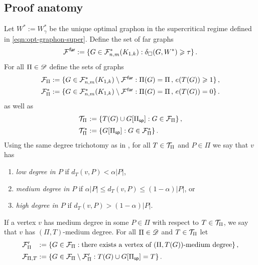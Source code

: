 \subsection{Proof anatomy}
Let $W^\ast:=W^\ast_\gamma$ be the unique optimal graphon in the supercritical regime defined in \eqref{eqn:opt-graphon-super}. Define the set of far graphs
$${\mathcal F}^{\hspace{0.2mm}\mathsf{far}}:=\{G\in{\mathcal F}^\ast_{n,m}(K_{1,k}):\delta_\square(G,W^\ast)\geqslant\tau\}\,.$$
For all $\Pi\in{\mathscr D}$ define the sets of graphs
$$\arraycolsep=1.4pt
\begin{array}{ll}
\cF_\Pi &:= \{G\in\cF^\ast_{n,m}(K_{1,k})\setminus\cF^\far:\Pi(G)=\Pi\,,\,e(T(G))\geq1\} \,, \\[5pt]
\cF^\ast_\Pi &:= \{G\in\cF^\ast_{n,m}(K_{1,k})\setminus\cF^\far:\Pi(G)=\Pi\,,\,e(T(G))=0\} \,.
\end{array}$$
as well as
$$\arraycolsep=1.4pt
\begin{array}{ll}
\cT_\Pi &:= \{T(G)\cup G[\Pi_\sparse]:G\in\cF_\Pi\} \,, \\[5pt]
\cT^\ast_\Pi &:= \{G[\Pi_\sparse]:G\in\cF^\ast_\Pi\} \,.
\end{array}$$
Using the same degree trichotomy as in \cite{perkins2025typical}, for all $T\in{\mathcal T}_\Pi$ and $P\in\Pi$ we say that $v$ has
\begin{enumerate}[(\emph{\roman*})]
	\item \emph{low degree in $P$}  if $d_T(v,P)<\alpha|P|$,
    \item \emph{medium degree in $P$} if $\alpha|P|\leq d_T(v,P)\leq(1-\alpha)|P|$, or
	\item \emph{high degree in $P$} if $d_T(v,P)>(1-\alpha)|P|$.
\end{enumerate}
If a vertex $v$ has medium degree in some $P\in\Pi$ with respect to $T\in{\mathcal T}_\Pi$, we say that $v$ has $(\Pi,T)$-medium degree. For all $\Pi\in{\mathscr D}$ and $T\in{\mathcal T}_\Pi$ let
$$\arraycolsep=1.4pt
\begin{array}{ll}
\cF'_\Pi &:= \{G\in\cF_\Pi:\text{there exists a vertex of $(\Pi,T(G))$-medium degree}\} \,, \\[5pt]
\cF_{\Pi,T} &:= \{G\in\cF_\Pi\setminus\cF'_\Pi:T(G)\cup G[\Pi_\sparse]=T\} \,.
\end{array}$$

